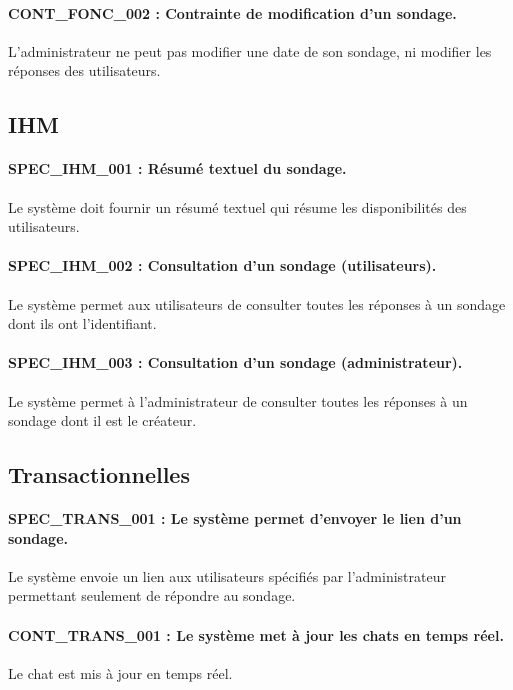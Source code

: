 \documentclass[titlepage]{report}
\begin{document}
\paragraph{CONT\_FONC\_002 : Contrainte de modification d’un sondage.}
L’administrateur ne peut pas modifier une date de son sondage, ni modifier les réponses des utilisateurs.

\subsection{IHM}

\paragraph{SPEC\_IHM\_001 : Résumé textuel du sondage.}
Le système doit fournir un résumé textuel qui résume les disponibilités des utilisateurs.

\paragraph{SPEC\_IHM\_002 : Consultation d’un sondage (utilisateurs).}
Le système permet aux utilisateurs de consulter toutes les réponses à un sondage dont ils ont l’identifiant.

\paragraph{SPEC\_IHM\_003 : Consultation d’un sondage (administrateur).}
Le système permet à l’administrateur de consulter toutes les réponses à un sondage dont il est le créateur.

\subsection{Transactionnelles}

\paragraph{SPEC\_TRANS\_001 : Le système permet d'envoyer le lien d’un sondage.}
Le système envoie un lien aux utilisateurs spécifiés par l'administrateur permettant seulement de répondre au sondage.

\paragraph{CONT\_TRANS\_001 : Le système met à jour les chats en temps réel.}
Le chat est mis à jour en temps réel.
\end{document}
